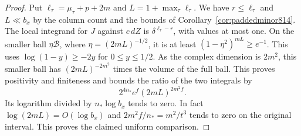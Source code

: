 \documentclass[a4paper,11pt]{article}
\theoremstyle{definition}
\theoremstyle{remark}
\numberwithin{equation}{section}
\begin{document}
\begin{proof}
Put \(\ell_\tau=\mu_\tau+p+2m\) and
\(L=1+\max_\tau\ell_\tau\). We have
\(r\le\ell_\tau\) and \(L\ll b_x\) by the column count
and the bounds of Corollary~\ref{cor:paddedminor814}.
The local integrand for \(J\) against \(c\,dZ\) is
\(\delta^{\ell_\tau-r}\), with values at most one.
On the smaller ball \(\eta\mathcal B\),
where \(\eta=(2mL)^{-1/2}\), it is at least
\((1-\eta^2)^{mL}\ge e^{-1}\). This uses
\(\log(1-y)\ge-2y\) for \(0\le y\le1/2\).
As the complex dimension is \(2m^2\), this smaller ball
has \((2mL)^{-2m^2}\) times the volume of the full ball.
This proves positivity and finiteness and bounds the
ratio of the two integrals by
\[
          2^{4n_*} e^f (2mL)^{2m^2f}.
\]
Its logarithm divided by \(n_*\log b_x\) tends to zero.
In fact \(\log(2mL)=O(\log b_x)\) and \(2m^2 f/n_*=m^2/t^3\)
tends to zero on the original interval. This proves the
claimed uniform comparison.
\end{proof}
\end{document}
